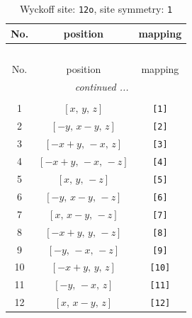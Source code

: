 \documentclass[fleqn,8pt]{jsarticle}
\begin{document}
\renewcommand{\arraystretch}{1.2}
\begin{longtable}{ccc}
\caption{Wyckoff site: {\tt 12o}, site symmetry: {\tt 1}}
 \\
 \hline \hline
No. & position & mapping \\ \hline \endfirsthead

\multicolumn{2}{l}{\tablename\ \thetable{}} \\
 \hline \hline
No. & position & mapping \\ \hline \endhead

 \hline \hline
\multicolumn{2}{r}{\footnotesize\it continued ...} \\ \endfoot

 \hline \hline
\multicolumn{2}{r}{} \\ \endlastfoot

1 & $\left[ x,\, y,\, z \right]$ & {\tt [1]} \\ \hline
2 & $\left[ - y,\, x - y,\, z \right]$ & {\tt [2]} \\ \hline
3 & $\left[ - x + y,\, - x,\, z \right]$ & {\tt [3]} \\ \hline
4 & $\left[ - x + y,\, - x,\, - z \right]$ & {\tt [4]} \\ \hline
5 & $\left[ x,\, y,\, - z \right]$ & {\tt [5]} \\ \hline
6 & $\left[ - y,\, x - y,\, - z \right]$ & {\tt [6]} \\ \hline
7 & $\left[ x,\, x - y,\, - z \right]$ & {\tt [7]} \\ \hline
8 & $\left[ - x + y,\, y,\, - z \right]$ & {\tt [8]} \\ \hline
9 & $\left[ - y,\, - x,\, - z \right]$ & {\tt [9]} \\ \hline
10 & $\left[ - x + y,\, y,\, z \right]$ & {\tt [10]} \\ \hline
11 & $\left[ - y,\, - x,\, z \right]$ & {\tt [11]} \\ \hline
12 & $\left[ x,\, x - y,\, z \right]$ & {\tt [12]} \\
\end{longtable}
\end{document}

